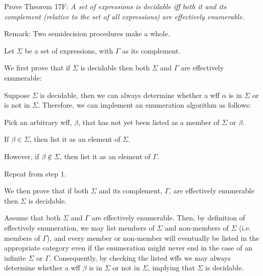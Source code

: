 \begin{problem}
  Prove Theorem 17F:
  \emph{
    A set of expressions is decidable iff
    both it and its complement 
    (relative to the set of all expressions)
    are effectively enumerable.
  }

  \step
  Remark: Two semidecision procedures make a whole.
\end{problem}
\begin{Answer}
  Let $\Sigma$ be a set of expressions,
  with $\Gamma$ as its complement.

  \step
  We first prove that if $\Sigma$ is decidable
  then both $\Sigma$ and $\Gamma$
  are effectively enumerable:

  \noindent
  Suppose $\Sigma$ is decidable, then we can always determine
  whether a wff $\alpha$ is in $\Sigma$ or is not in $\Sigma$.
  Therefore, we can implement an enumeration algorithm
  as follows:
  \begin{enumroman}
    \item Pick an arbitrary wff, $\beta$, that has not yet been listed as a member of $\Sigma$ or $\beta$.
    \item If $\beta \in \Sigma$, then list it as an element of $\Sigma$.
    \item However, if $\beta \not\in \Sigma$, then list it as an element of $\Gamma$.
    \item Repeat from step $1$.
  \end{enumroman}
  
  \bigskip
  \step
  We then prove that if both $\Sigma$ and its complement,
  $\Gamma$, are effectively enumerable then $\Sigma$ is decidable.
  
  \noindent
  Assume that both $\Sigma$ and $\Gamma$ are effectively enumerable.
  Then, by definition of effectively enumeration,
  we may list members of $\Sigma$ and non-members of $\Sigma$
  (i.e. members of $\Gamma$),
  and every member or non-member will eventually be listed in the appropriate category
  even if the enumeration might never end in the case of an infinite $\Sigma$ or $\Gamma$.
  Consequently, by checking the listed wffs we may always determine
  whether a wff $\beta$ is in $\Sigma$ or not in $\Sigma$, implying that $\Sigma$ is decidable.
\end{Answer}

